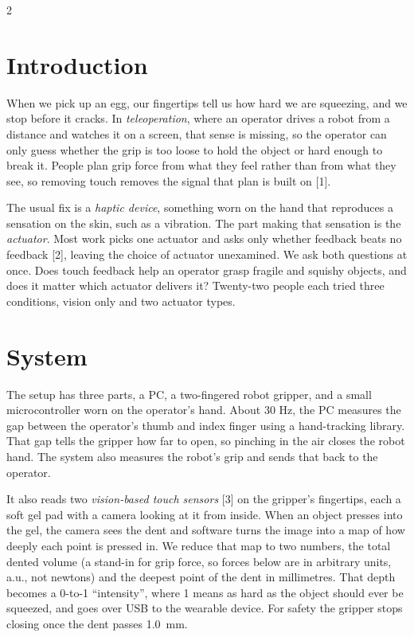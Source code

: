 \documentclass[a4paper, 12pt]{article}
\begin{document}
\begin{multicols}{2}

  \section{Introduction}

  When we pick up an egg, our fingertips tell us how hard we are squeezing, and we stop
  before it cracks. In \emph{teleoperation}, where an operator drives a robot from a
  distance and watches it on a screen, that sense is missing, so the operator can only guess
  whether the grip is too loose to hold the object or hard enough to break it. People plan
  grip force from what they feel rather than from what they see, so removing touch removes
  the signal that plan is built on [1].

  The usual fix is a \emph{haptic device}, something worn on the hand that reproduces a
  sensation on the skin, such as a vibration. The part making that sensation is the
  \emph{actuator}. Most work picks one actuator and asks only whether feedback beats no
  feedback [2], leaving the choice of actuator unexamined. We ask both questions at once.
  Does touch feedback help an operator grasp fragile and squishy objects, and does it matter
  which actuator delivers it? Twenty-two people each tried three conditions, vision only and
  two actuator types.

  \section{System}

  The setup has three parts, a PC, a two-fingered robot gripper, and a small microcontroller
  worn on the operator's hand. About 30 Hz, the PC measures the gap between the operator's
  thumb and index finger using a hand-tracking library. That gap tells the gripper how far to
  open, so pinching in the air closes the robot hand. The system also measures the robot's grip
  and sends that back to the operator.

  It also reads two \emph{vision-based touch sensors} [3] on the gripper's fingertips, each a
  soft gel pad with a camera looking at it from inside. When an object presses into
  the gel, the camera sees the dent and software turns the image into a map of how deeply
  each point is pressed in. We reduce that map to two numbers, the total dented volume (a
  stand-in for grip force, so forces below are in arbitrary units, a.u., not newtons) and the
  deepest point of the dent in millimetres. That depth becomes a 0-to-1 ``intensity'', where
  1 means as hard as the object should ever be squeezed, and goes over USB to the wearable
  device. For safety the gripper stops closing once the dent passes 1.0~mm.


\end{multicols}
\end{document}
